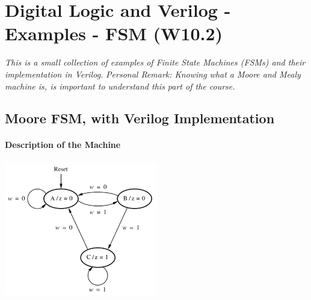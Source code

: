 \documentclass[12pt,openany]{book}
\begin{document}
\chapter{Digital Logic and Verilog - Examples - FSM (W10.2)}
\textit{This is a small collection of examples of Finite State Machines (FSMs) and their implementation in Verilog.
}\newline
\textit{Personal Remark: Knowing what a Moore and Mealy machine is, is important to understand this part of the course.}
\section{Moore FSM, with Verilog Implementation}
\subsubsection*{Description of the Machine}
\begin{center}
	\includegraphics[width=0.5\textwidth]{circuits/17.1.png}
\end{center}
\end{document}
